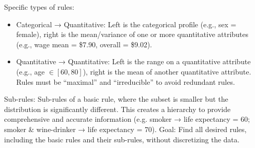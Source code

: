 \documentclass[12pt,letterpaper, onecolumn]{exam}
\begin{document}
\begin{questions}
\begin{solution}
        Specific types of rules:
        \begin{itemize}
            \item Categorical → Quantitative: Left is the categorical profile (e.g., sex = female), right is the mean/variance of one or more quantitative attributes (e.g., wage mean = \$7.90, overall = \$9.02).
            \item Quantitative → Quantitative: Left is the range on a quantitative attribute (e.g., age $\in [60,80]$), right is the mean of another quantitative attribute. Rules must be “maximal” and “irreducible” to avoid redundant rules.
        \end{itemize}

Sub-rules: Sub-rules of a basic rule, where the subset is smaller but the distribution is significantly different. This creates a hierarchy to provide comprehensive and accurate information (e.g. smoker → life expectancy = 60; smoker \& wine-drinker → life expectancy = 70).
Goal: Find all desired rules, including the basic rules and their sub-rules, without discretizing the data.


\end{solution}
\end{questions}
\end{document}

